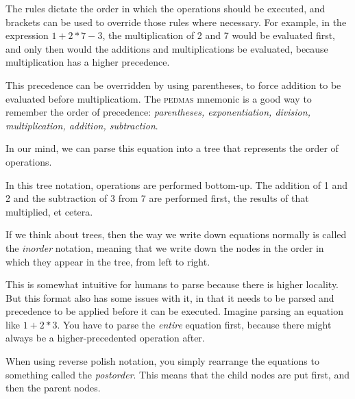 \documentclass[a4paper,twocolumn]{article}
\begin{document}
The rules dictate the order in which the operations should be executed, and brackets can be used to override those rules where necessary. For example, in the expression $1 + 2 * 7 - 3$, the multiplication of 2 and 7 would be evaluated first, and only then would the additions and multiplications be evaluated, because multiplication has a higher precedence.

This precedence can be overridden by using parentheses, to force addition to be evaluated before multiplicatiom. The \textsc{pedmas} mnemonic is a good way to remember the order of precedence: \emph{parentheses, exponentiation, division, multiplication, addition, subtraction}. 

In our mind, we can parse this equation into a tree that represents the order of operations.

\begin{center}
\end{center}

In this tree notation, operations are performed bottom-up. The addition of 1 and 2 and the subtraction of 3 from 7 are performed first, the results of that multiplied, et cetera.


If we think about trees, then the way we write down equations normally is called the \emph{inorder} notation, meaning that we write down the nodes in the order in which they appear in the tree, from left to right.

\begin{center}
\end{center}

This is somewhat intuitive for humans to parse because there is higher locality. But this format also has some issues with it, in that it needs to be parsed and precedence to be applied before it can be executed. Imagine parsing an equation like $1 + 2 * 3$. You have to parse the \emph{entire} equation first, because there might always be a higher-precedented operation after.

When using reverse polish notation, you simply rearrange the equations to something called the \emph{postorder}. This means that the child nodes are put first, and then the parent nodes.
\end{document}
